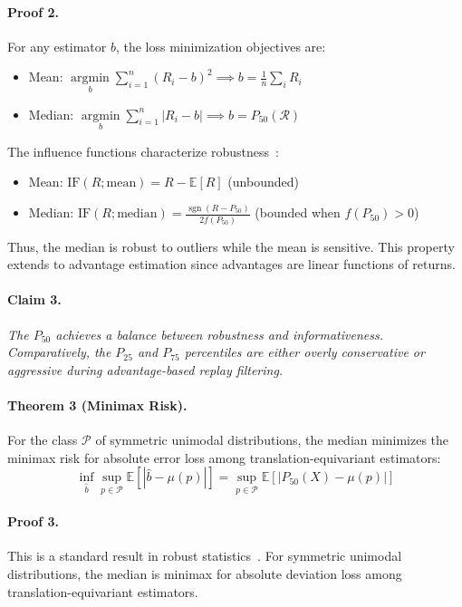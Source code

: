 \documentclass[]{youtu} %
\begin{document}
{\paragraph{Proof 2.} For any estimator $b$, the loss minimization objectives are:
\begin{itemize}
    \item Mean: $\underset{b}{\operatorname{argmin}} \sum_{i=1}^n (R_i - b)^2 \implies b = \frac{1}{n}\sum_i R_i$
    \item Median: $\underset{b}{\operatorname{argmin}} \sum_{i=1}^n |R_i - b| \implies b = P_{50}(\mathcal{R})$
\end{itemize}

The influence functions characterize robustness~\cite{huber2011robust}:
\begin{itemize}
    \item Mean: $\text{IF}(R; \text{mean}) = R - \mathbb{E}[R]$ (unbounded)
    \item Median: $\text{IF}(R; \text{median}) = \frac{\operatorname{sgn}(R - P_{50})}{2f(P_{50})}$ (bounded when $f(P_{50}) > 0$)
\end{itemize}

Thus, the median is robust to outliers while the mean is sensitive. This property extends to advantage estimation since advantages are linear functions of returns.



\paragraph{Claim 3.}\textit{The $P_{50}$ achieves a balance between robustness and informativeness. Comparatively, the $P_{25}$ and $P_{75}$ percentiles are either overly conservative or aggressive during advantage-based replay filtering.}

\paragraph{Theorem 3 (Minimax Risk).} For the class $\mathcal{P}$ of symmetric unimodal distributions, the median minimizes the minimax risk for absolute error loss among translation-equivariant estimators:
\begin{equation}
    \inf_{\hat{b}} \sup_{p \in \mathcal{P}} \mathbb{E}[|\hat{b} - \mu(p)|] = \sup_{p \in \mathcal{P}} \mathbb{E}[|P_{50}(X) - \mu(p)|]
\end{equation}

\paragraph{Proof 3.} This is a standard result in robust statistics~\cite{law1986robust, huber2011robust}. For symmetric unimodal distributions, the median is minimax for absolute deviation loss among translation-equivariant estimators.


}
\end{document}
